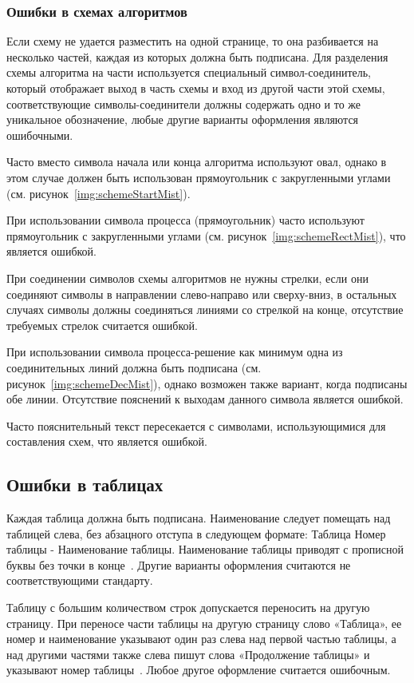 \begin{appendices}
	\subsubsection{Ошибки в схемах алгоритмов}
	Если схему не удается разместить на одной странице, то она разбивается на несколько частей, каждая из которых должна быть подписана. Для разделения схемы алгоритма на части используется специальный символ-соединитель, который отображает выход в часть схемы и вход из другой части этой схемы, соответствующие символы-соединители должны содержать одно и то же уникальное обозначение, любые другие варианты оформления являются ошибочными.
	
	Часто вместо символа начала или конца алгоритма используют овал, однако в этом случае должен быть использован прямоугольник с закругленными углами (см. рисунок~\ref{img:schemeStartMist}).
	
	При использовании символа процесса (прямоугольник) часто используют прямоугольник с закругленными углами (см. рисунок~\ref{img:schemeRectMist}), что является ошибкой.
	
	При соединении символов схемы алгоритмов не нужны стрелки, если они соединяют символы в направлении слево-направо или сверху-вниз, в остальных случаях символы должны соединяться линиями со стрелкой на конце, отсутствие требуемых стрелок считается ошибкой.
	
	При использовании символа процесса-решение как минимум одна из соединительных линий должна быть подписана (см. рисунок~\ref{img:schemeDecMist}), однако возможен также вариант, когда подписаны обе линии. Отсутствие пояснений к выходам данного символа является ошибкой.
	
	Часто пояснительный текст пересекается с символами, использующимися для составления схем, что является ошибкой.
	
	\subsection{Ошибки в таблицах}
	Каждая таблица должна быть подписана. Наименование следует помещать над таблицей слева, без абзацного отступа в следующем формате: Таблица Номер таблицы - Наименование таблицы. Наименование таблицы приводят с прописной буквы без точки в конце~\cite{GOST732}. Другие варианты оформления считаются не соответствующими стандарту.
	
	Таблицу с большим количеством строк допускается переносить на другую страницу. При переносе части таблицы на другую страницу слово «Таблица», ее номер и наименование указывают один раз слева над первой частью таблицы, а над другими частями также слева пишут слова «Продолжение таблицы» и указывают номер таблицы~\cite{GOST732}. Любое другое оформление считается ошибочным.
	

\end{appendices}

